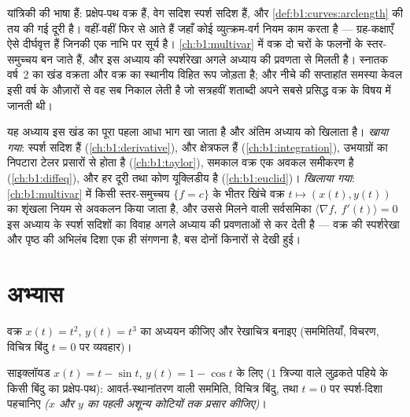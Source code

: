 \begin{remark}[ये वक्र कहाँ जाते हैं]
\label{rem:b1:curves:whereused}
 यांत्रिकी की भाषा हैं: प्रक्षेप-पथ वक्र हैं, वेग सदिश स्पर्श
सदिश हैं, और \cref{def:b1:curves:arclength} की  तय की गई दूरी है।
 वहीं-वहीं फिर से आते हैं जहाँ कोई व्युत्क्रम-वर्ग नियम काम करता है ---
ग्रह-कक्षाएँ ऐसे दीर्घवृत्त हैं जिनकी एक नाभि पर सूर्य है।
\cref{ch:b1:multivar} में वक्र दो चरों के फलनों के स्तर-समुच्चय बन जाते हैं,
और इस अध्याय की स्पर्शरेखा अगले अध्याय की प्रवणता से मिलती है। स्नातक वर्ष~2
का खंड वक्रता और वक्र का स्थानीय विहित रूप जोड़ता है; और नीचे की सप्ताहांत
समस्या केवल इसी वर्ष के औज़ारों से वह सब निकाल लेती है जो सत्रहवीं शताब्दी
अपने सबसे प्रसिद्ध वक्र के विषय में जानती थी।
\end{remark}

\begin{remark}[पुस्तक 3 के भीतर के परिदृश्य]
\label{rem:b1:curves:perspectives}
यह अध्याय इस खंड का पूरा पहला आधा भाग खा जाता है और अंतिम अध्याय को खिलाता
है। \emph{खाया गया}: स्पर्श सदिश  हैं (\cref{ch:b1:derivative}),  और क्षेत्रफल  हैं (\cref{ch:b1:integration}), उभयाग्रों का
निपटारा टेलर प्रसारों से होता है (\cref{ch:b1:taylor}), समकाल वक्र एक 
अवकल समीकरण है (\cref{ch:b1:diffeq}), और हर दूरी तथा कोण यूक्लिडीय है
(\cref{ch:b1:euclid})। \emph{खिलाया गया}: \cref{ch:b1:multivar} में किसी
स्तर-समुच्चय $\{f = c\}$ के भीतर खिंचे वक्र $t \mapsto (x(t), y(t))$ का
शृंखला नियम से अवकलन किया जाता है, और उससे मिलने वाली सर्वसमिका $\langle
\nabla f,\ f'(t)\rangle = 0$ इस अध्याय के स्पर्श सदिशों का विवाह अगले अध्याय
की प्रवणताओं से कर देती है --- वक्र की स्पर्शरेखा और पृष्ठ की अभिलंब दिशा एक
ही संगणना है, बस दोनों किनारों से देखी हुई।
\end{remark}

\section{अभ्यास}

\begin{exercise}[$\star$]\label{exo:b1:curves:1}
वक्र $x(t) = t^2$, $y(t) = t^3$ का अध्ययन कीजिए और रेखाचित्र बनाइए
(सममितियाँ, विचरण, विचित्र बिंदु $t = 0$ पर व्यवहार)।
\end{exercise}

\begin{exercise}[$\star$]\label{exo:b1:curves:2}
साइक्लॉयड $x(t) = t - \sin t$, $y(t) = 1 - \cos t$ के लिए ($1$ त्रिज्या वाले
लुढ़कते पहिये के किसी बिंदु का प्रक्षेप-पथ): आवर्त-स्थानांतरण वाली सममिति,
विचित्र बिंदु, तथा $t = 0$ पर स्पर्श-दिशा पहचानिए \emph{($x$ और $y$ का पहली
अशून्य कोटियों तक प्रसार कीजिए)}।
\end{exercise}

